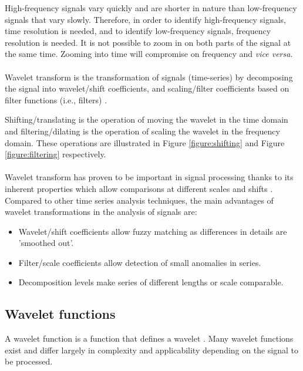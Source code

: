 High-frequency signals vary quickly and are shorter in nature than
low-frequency signals that vary slowly. Therefore, in order to identify
high-frequency signals, time resolution is needed, and to identify
low-frequency signals, frequency resolution is needed. It is not possible to
zoom in on both parts of the signal at the same time. Zooming into time will
compromise on frequency and \textit{vice versa}.

\paragraph{}
Wavelet transform is the transformation of signals (time-series) by
decomposing the signal into wavelet/shift coefficients, and scaling/filter
coefficients based on filter functions (i.e., filters) \cite{karus2013}.

Shifting/translating is the operation of moving the wavelet in the time domain
and filtering/dilating is the operation of scaling the wavelet in the frequency
domain. These operations are illustrated in Figure \ref{figure:shifting} and
Figure \ref{figure:filtering} respectively.


\vspace{1em}


\paragraph{}
Wavelet transform has proven to be important in signal processing thanks to its
inherent properties which allow comparisons at different scales and shifts
\cite{karus2013}. Compared to other time series analysis techniques, the main
advantages of wavelet transformations in the analysis of signals are:
\begin{itemize}
	\item Wavelet/shift coefficients allow fuzzy matching as differences in details
	are 'smoothed out'.
	\item Filter/scale coefficients allow detection of small anomalies in series.
	\item Decomposition levels make series of different lengths or scale
	comparable.
\end{itemize}

\subsection{Wavelet functions}
A wavelet function is a function that defines a wavelet \cite{wadkar}. Many
wavelet functions exist and differ largely in complexity and applicability
depending on the signal to be processed.

